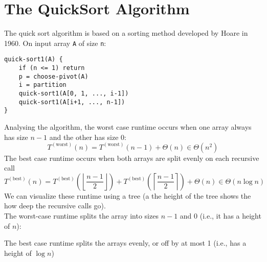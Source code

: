 \documentclass{report}
\begin{document}
\section{The QuickSort Algorithm}
The quick sort algorithm is based on a sorting method developed by Hoare in 1960. On input array \texttt{A} of size \texttt{n}:
\begin{lstlisting}
quick-sort1(A) {
	if (n <= 1) return
	p = choose-pivot(A)
	i = partition
	quick-sort1(A[0, 1, ..., i-1])
	quick-sort1(A[i+1, ..., n-1])
}
\end{lstlisting}
Analysing the algorithm, the worst case runtime occurs when one array always has size $n-1$ and the other has size 0:
$$T^{\mathrm{(worst)}}(n) = T^{\mathrm{(worst)}}(n-1) + \Theta(n) \in \Theta(n^2)$$
The best case runtime occurs when both arrays are split evenly on each recursive call
$$T^{\mathrm{(best)}}(n) = T^{\mathrm{(best)}}\left(\left\lfloor \frac{n-1}{2}\right\rfloor\right) + T^{\mathrm{(best)}}\left(\left\lceil \frac{n-1}{2}\right\rceil\right) + \Theta(n) \in \Theta(n \log n)$$
We can visualize these runtime using a tree (a the height of the tree shows the how deep the recursive calls go).\\

The worst-case runtime splits the array into sizes $n-1$ and 0 (i.e., it has a height of $n$):
\begin{center}
\end{center}
The best case runtime splits the arrays evenly, or off by at most 1 (i.e., has a height of $\log n$)
\begin{center}
\end{center}
\end{document}
